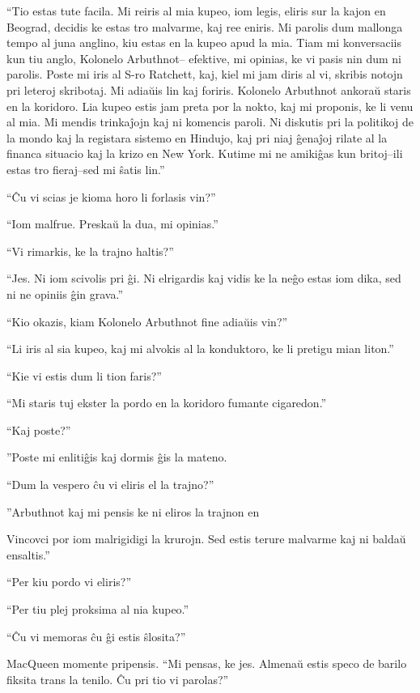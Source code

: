 ``Tio estas tute facila. Mi reiris al mia kupeo, iom legis, eliris sur la kajon en Beograd, decidis ke estas tro malvarme, kaj ree eniris. Mi parolis dum mallonga tempo al juna anglino, kiu estas en la kupeo apud la mia. Tiam mi konversaciis kun tiu anglo, Kolonelo Arbuthnot-- efektive, mi opinias, ke vi pasis nin dum ni parolis. Poste mi iris al S-ro Ratchett, kaj, kiel mi jam diris al vi, skribis notojn pri leteroj skribotaj. Mi adiaŭis lin kaj foriris. Kolonelo Arbuthnot ankoraŭ staris en la koridoro. Lia kupeo estis jam preta por la nokto, kaj mi proponis, ke li venu al mia. Mi mendis trinkaĵojn kaj ni komencis paroli. Ni diskutis pri la politikoj de la mondo kaj la registara sistemo en Hindujo, kaj pri niaj ĝenaĵoj rilate al la financa situacio kaj la krizo en New York. Kutime mi ne amikiĝas kun britoj--ili estas tro fieraj--sed mi ŝatis lin.''

``Ĉu vi scias je kioma horo li forlasis vin?''

``Iom malfrue. Preskaŭ la dua, mi opinias.''

``Vi rimarkis, ke la trajno haltis?''

``Jes. Ni iom scivolis pri ĝi. Ni elrigardis kaj vidis ke la neĝo estas iom dika, sed ni ne opiniis ĝin grava.''

``Kio okazis, kiam Kolonelo Arbuthnot fine adiaŭis vin?''

``Li iris al sia kupeo, kaj mi alvokis al la konduktoro, ke li pretigu mian liton.''

``Kie vi estis dum li tion faris?''

``Mi staris tuj ekster la pordo en la koridoro fumante cigaredon.''

``Kaj poste?''

''Poste mi enlitiĝis kaj dormis ĝis la mateno.

``Dum la vespero ĉu vi eliris el la trajno?''

''Arbuthnot kaj mi pensis ke ni eliros la trajnon en

Vincovci por iom malrigidigi la krurojn. Sed estis terure malvarme kaj ni baldaŭ ensaltis.''

``Per kiu pordo vi eliris?''

``Per tiu plej proksima al nia kupeo.''

``Ĉu vi memoras ĉu ĝi estis ŝlosita?''

MacQueen momente pripensis. ``Mi pensas, ke jes. Almenaŭ estis speco de barilo fiksita trans la tenilo. Ĉu pri tio vi parolas?''

